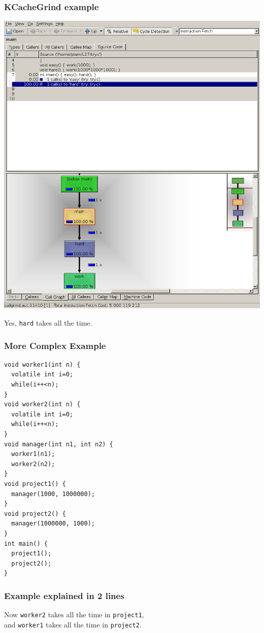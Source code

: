 \documentclass[aspectratio=43]{beamer}
\newenvironment{changemargin}[1]{%
  \begin{list}{}{%
    \setlength{\topsep}{0pt}%
    \setlength{\leftmargin}{#1}%
    \setlength{\rightmargin}{1em}
    \setlength{\listparindent}{\parindent}%
    \setlength{\itemindent}{\parindent}%
    \setlength{\parsep}{\parskip}%
  }%
  \item[]}{\end{list}}
\begin{document}
\begin{frame}
  \frametitle{KCacheGrind example}
  \begin{center}
    \includegraphics[width=.5\textwidth]{L27/kcachegrind}
  \end{center}
  \begin{changemargin}{2cm}
    Yes, {\tt hard} takes all the time.
  \end{changemargin}
\end{frame}

\begin{frame}[fragile]
  \frametitle{More Complex Example}

  \begin{center}
  \begin{minipage}{.7\textwidth}
\begin{lstlisting}
void worker1(int n) {
  volatile int i=0;
  while(i++<n);
}
void worker2(int n) {
  volatile int i=0;
  while(i++<n);
}
void manager(int n1, int n2) {
  worker1(n1);
  worker2(n2);
}
void project1() {
  manager(1000, 1000000);
}
void project2() {
  manager(1000000, 1000);
}
int main() {
  project1();
  project2();
}
\end{lstlisting}
  \end{minipage}
  \end{center}
  
\end{frame}

\begin{frame}
  \frametitle{Example explained in 2 lines}
  \begin{changemargin}{2cm}
    Now {\tt worker2} takes all the time in {\tt project1},\\
    and {\tt worker1} takes all the time in {\tt project2}.
  \end{changemargin}
\end{frame}
\end{document}
